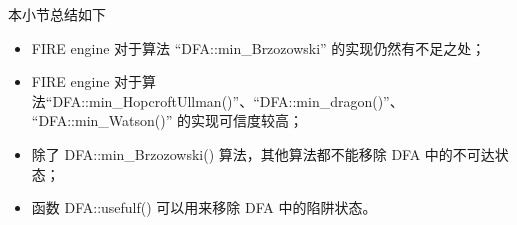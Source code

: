 





本小节总结如下
\begin{itemize}
    \item FIRE engine 对于算法 “DFA::min\_Brzozowski” 的实现仍然有不足之处；
    \item FIRE engine 对于算法“DFA::min\_HopcroftUllman()”、“DFA::min\_dragon()”、\\ “DFA::min\_Watson()” 的实现可信度较高；
    \item 除了 DFA::min\_Brzozowski() 算法，其他算法都不能移除 DFA 中的不可达状态；
    \item 函数 DFA::usefulf() 可以用来移除 DFA 中的陷阱状态。
\end{itemize}
